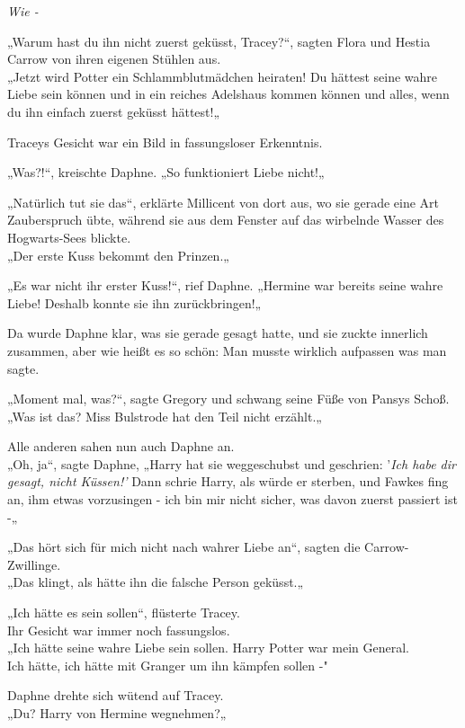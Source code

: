 {\emph{Wie -}

„Warum hast du ihn nicht zuerst geküsst, Tracey?“, sagten Flora und Hestia Carrow von ihren eigenen Stühlen aus.\\ „Jetzt wird Potter ein Schlammblutmädchen heiraten! Du hättest seine wahre Liebe sein können und in ein reiches Adelshaus kommen können und alles, wenn du ihn einfach zuerst geküsst hättest!„

Traceys Gesicht war ein Bild in fassungsloser Erkenntnis.

„Was?!“, kreischte Daphne. „So funktioniert Liebe nicht!„

„Natürlich tut sie das“, erklärte Millicent von dort aus, wo sie gerade eine Art Zauberspruch übte, während sie aus dem Fenster auf das wirbelnde Wasser des Hogwarts-Sees blickte.\\ „Der erste Kuss bekommt den Prinzen.„

„Es war nicht ihr erster Kuss!“, rief Daphne. „Hermine war bereits seine wahre Liebe! Deshalb konnte sie ihn zurückbringen!„

Da wurde Daphne klar, was sie gerade gesagt hatte, und sie zuckte innerlich zusammen, aber wie heißt es so schön: Man musste wirklich aufpassen was man sagte.

„Moment mal, was?“, sagte Gregory und schwang seine Füße von Pansys Schoß.\\ „Was ist das? Miss Bulstrode hat den Teil nicht erzählt.„

Alle anderen sahen nun auch Daphne an.\\ „Oh, ja“, sagte Daphne, „Harry hat sie weggeschubst und geschrien: '\emph{Ich habe dir gesagt, nicht Küssen!'} Dann schrie Harry, als würde er sterben, und Fawkes fing an, ihm etwas vorzusingen - ich bin mir nicht sicher, was davon zuerst passiert ist -„

„Das hört sich für mich nicht nach wahrer Liebe an“, sagten die Carrow-Zwillinge.\\ „Das klingt, als hätte ihn die falsche Person geküsst.„

„Ich hätte es sein sollen“, flüsterte Tracey.\\ Ihr Gesicht war immer noch fassungslos.\\ „Ich hätte seine wahre Liebe sein sollen. Harry Potter war mein General.\\ Ich hätte, ich hätte mit Granger um ihn kämpfen sollen -"

Daphne drehte sich wütend auf Tracey.\\ „Du? Harry von Hermine wegnehmen?„

}
